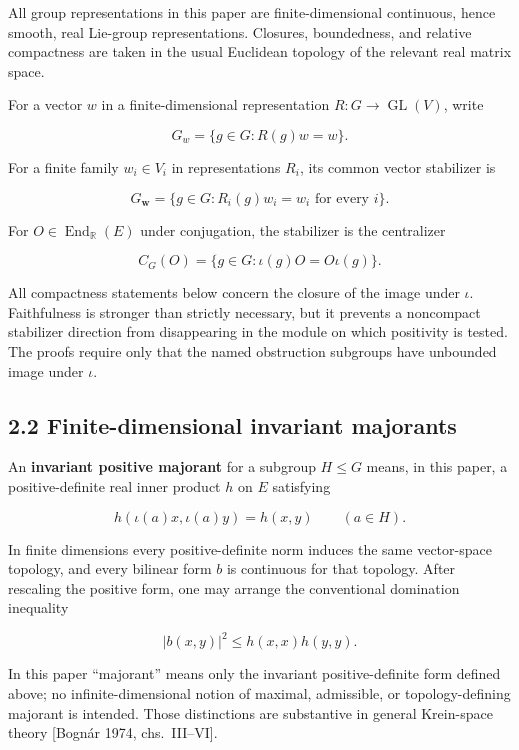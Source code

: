 \documentclass[
  10pt,
  letterpaper,
  oneside]{scrartcl}
\begin{document}
All group representations in this paper are finite-dimensional
continuous, hence smooth, real Lie-group representations. Closures,
boundedness, and relative compactness are taken in the usual Euclidean
topology of the relevant real matrix space.

For a vector \(w\) in a finite-dimensional representation
\(R:G\to\operatorname{GL}(V)\), write

\[
G_w=\{g\in G:R(g)w=w\}.
\]

For a finite family \(w_i\in V_i\) in representations \(R_i\), its
common vector stabilizer is

\[
G_{\mathbf w}=\{g\in G:R_i(g)w_i=w_i\text{ for every }i\}.
\]

For \(O\in\operatorname{End}_{\mathbb R}(E)\) under conjugation, the
stabilizer is the centralizer

\[
C_G(O)=\{g\in G:\iota(g)O=O\iota(g)\}.
\]

All compactness statements below concern the closure of the image under
\(\iota\). Faithfulness is stronger than strictly necessary, but it
prevents a noncompact stabilizer direction from disappearing in the
module on which positivity is tested. The proofs require only that the
named obstruction subgroups have unbounded image under \(\iota\).

\subsection{2.2 Finite-dimensional invariant
majorants}\label{finite-dimensional-invariant-majorants}

An \textbf{invariant positive majorant} for a subgroup \(H\leq G\)
means, in this paper, a positive-definite real inner product \(h\) on
\(E\) satisfying

\[
h(\iota(a)x,\iota(a)y)=h(x,y)
\qquad(a\in H).
\]

In finite dimensions every positive-definite norm induces the same
vector-space topology, and every bilinear form \(b\) is continuous for
that topology. After rescaling the positive form, one may arrange the
conventional domination inequality

\[
|b(x,y)|^2\leq h(x,x)h(y,y).
\]

In this paper ``majorant'' means only the invariant positive-definite
form defined above; no infinite-dimensional notion of maximal,
admissible, or topology-defining majorant is intended. Those
distinctions are substantive in general Krein-space theory {[}Bognár
1974, chs.~III--VI{]}.
\end{document}
